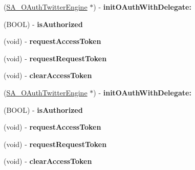\begin{DoxyCompactItemize}
\item 
\hypertarget{interface_s_a___o_auth_twitter_engine_a094f94ffe5dbcce632e6ddccd8fc7941}{
(\hyperlink{interface_s_a___o_auth_twitter_engine}{\-S\-A\-\_\-\-O\-Auth\-Twitter\-Engine} $\ast$) -\/ {\bfseries init\-O\-Auth\-With\-Delegate\-:}}
\label{interface_s_a___o_auth_twitter_engine_a094f94ffe5dbcce632e6ddccd8fc7941}

\item 
\hypertarget{interface_s_a___o_auth_twitter_engine_ad4c89811d013e4abf19b804a9cc3d0d8}{
(\-B\-O\-O\-L) -\/ {\bfseries is\-Authorized}}
\label{interface_s_a___o_auth_twitter_engine_ad4c89811d013e4abf19b804a9cc3d0d8}

\item 
\hypertarget{interface_s_a___o_auth_twitter_engine_add65ab8b2cf11bd219d238f6c9c177a6}{
(void) -\/ {\bfseries request\-Access\-Token}}
\label{interface_s_a___o_auth_twitter_engine_add65ab8b2cf11bd219d238f6c9c177a6}

\item 
\hypertarget{interface_s_a___o_auth_twitter_engine_a999967b00a618a9bd7109d6c744bfdb4}{
(void) -\/ {\bfseries request\-Request\-Token}}
\label{interface_s_a___o_auth_twitter_engine_a999967b00a618a9bd7109d6c744bfdb4}

\item 
\hypertarget{interface_s_a___o_auth_twitter_engine_a47648a4a45813f612b14a9d01ebd406d}{
(void) -\/ {\bfseries clear\-Access\-Token}}
\label{interface_s_a___o_auth_twitter_engine_a47648a4a45813f612b14a9d01ebd406d}

\item 
\hypertarget{interface_s_a___o_auth_twitter_engine_a094f94ffe5dbcce632e6ddccd8fc7941}{
(\hyperlink{interface_s_a___o_auth_twitter_engine}{\-S\-A\-\_\-\-O\-Auth\-Twitter\-Engine} $\ast$) -\/ {\bfseries init\-O\-Auth\-With\-Delegate\-:}}
\label{interface_s_a___o_auth_twitter_engine_a094f94ffe5dbcce632e6ddccd8fc7941}

\item 
\hypertarget{interface_s_a___o_auth_twitter_engine_ad4c89811d013e4abf19b804a9cc3d0d8}{
(\-B\-O\-O\-L) -\/ {\bfseries is\-Authorized}}
\label{interface_s_a___o_auth_twitter_engine_ad4c89811d013e4abf19b804a9cc3d0d8}

\item 
\hypertarget{interface_s_a___o_auth_twitter_engine_add65ab8b2cf11bd219d238f6c9c177a6}{
(void) -\/ {\bfseries request\-Access\-Token}}
\label{interface_s_a___o_auth_twitter_engine_add65ab8b2cf11bd219d238f6c9c177a6}

\item 
\hypertarget{interface_s_a___o_auth_twitter_engine_a999967b00a618a9bd7109d6c744bfdb4}{
(void) -\/ {\bfseries request\-Request\-Token}}
\label{interface_s_a___o_auth_twitter_engine_a999967b00a618a9bd7109d6c744bfdb4}

\item 
\hypertarget{interface_s_a___o_auth_twitter_engine_a47648a4a45813f612b14a9d01ebd406d}{
(void) -\/ {\bfseries clear\-Access\-Token}}
\label{interface_s_a___o_auth_twitter_engine_a47648a4a45813f612b14a9d01ebd406d}

\end{DoxyCompactItemize}
